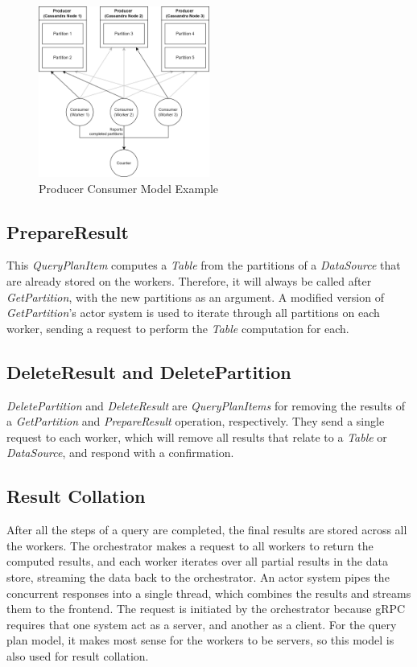 \begin{figure}[h]
	\centering
	\includegraphics[width=0.5\textwidth]{chapters/diagrams/implementation/producer-consumer-model-example}
	\caption{Producer Consumer Model Example}
	\label{fig:producer-consumer-model-example}
\end{figure}

\subsection{PrepareResult}
This \textit{QueryPlanItem} computes a \textit{Table} from the partitions of a \textit{DataSource} that are already stored on the workers. Therefore, it will always be called after \textit{GetPartition}, with the new partitions as an argument. A modified version of \textit{GetPartition}'s actor system is used to iterate through all partitions on each worker, sending a request to perform the \textit{Table} computation for each.

\subsection{DeleteResult and DeletePartition}
\textit{DeletePartition} and \textit{DeleteResult} are \textit{QueryPlanItems} for removing the results of a \textit{GetPartition} and \textit{PrepareResult} operation, respectively. They send a single request to each worker, which will remove all results that relate to a \textit{Table} or \textit{DataSource}, and respond with a confirmation.

\subsection{Result Collation}
After all the steps of a query are completed, the final results are stored across all the workers. The orchestrator makes a request to all workers to return the computed results, and each worker iterates over all partial results in the data store, streaming the data back to the orchestrator. An actor system pipes the concurrent responses into a single thread, which combines the results and streams them to the frontend. The request is initiated by the orchestrator because gRPC requires that one system act as a server, and another as a client. For the query plan model, it makes most sense for the workers to be servers, so this model is also used for result collation.

